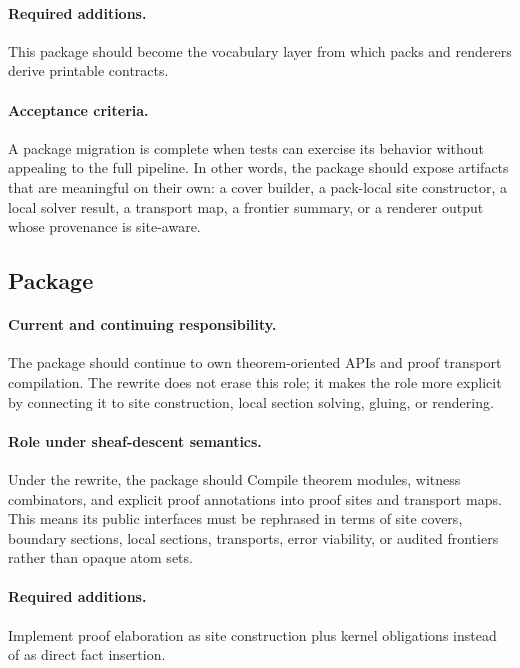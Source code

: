 \documentclass[11pt]{report}
\DeclareRobustCommand{\py}[1]{\texttt{\detokenize{#1}}}
\theoremstyle{definition}
\theoremstyle{plain}
\begin{document}
\paragraph{Required additions.}
This package should become the vocabulary layer from which packs and renderers derive printable contracts.

\paragraph{Acceptance criteria.}
A package migration is complete when tests can exercise its behavior without
appealing to the full pipeline. In other words, the package should expose
artifacts that are meaningful on their own: a cover builder, a pack-local
site constructor, a local solver result, a transport map, a frontier summary,
or a renderer output whose provenance is site-aware.

\subsection{Package \py{src/deppy/proof}}

\paragraph{Current and continuing responsibility.}
The package \py{src/deppy/proof} should continue to own theorem-oriented APIs and proof transport compilation. The
rewrite does not erase this role; it makes the role more explicit by
connecting it to site construction, local section solving, gluing, or
rendering.

\paragraph{Role under sheaf-descent semantics.}
Under the rewrite, the package should Compile theorem modules, witness combinators, and explicit proof annotations into proof sites and transport maps. This means its public
interfaces must be rephrased in terms of site covers, boundary sections,
local sections, transports, error viability, or audited frontiers rather
than opaque atom sets.

\paragraph{Required additions.}
Implement proof elaboration as site construction plus kernel obligations instead of as direct fact insertion.
\end{document}
